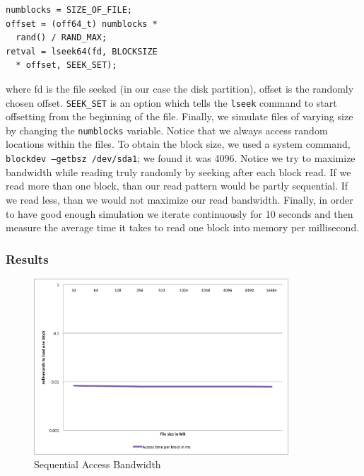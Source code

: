 \begin{lstlisting}
numblocks = SIZE_OF_FILE;
offset = (off64_t) numblocks *
  rand() / RAND_MAX;
retval = lseek64(fd, BLOCKSIZE 
  * offset, SEEK_SET);
\end{lstlisting}

where fd is the file seeked (in our case the disk partition), offset is the randomly chosen offset. \texttt{SEEK\_SET} is an option which tells the \texttt{lseek} command to start offsetting from the beginning of the file. Finally, we simulate files of varying size by changing the \texttt{numblocks} variable. Notice that we always access random locations within the files. To obtain the block size, we used a system command, \texttt{blockdev --getbsz /dev/sda1}; we found it was 4096. Notice we try to maximize bandwidth while reading truly randomly by seeking after each block read. If we read more than one block, than our read pattern would be partly sequential. If we read less, than we would not maximize our read bandwidth. Finally, in order to have good enough simulation we iterate continuously for 10 seconds and then measure the average time it takes to read one block into memory per millisecond.

\subsubsection{Results}

\begin{figure}
 \centering
  \includegraphics[width=0.85\textwidth]{image/sequential_read.png}
  \caption{Sequential Access Bandwidth}
 \label{fig:sequential}
\end{figure}

